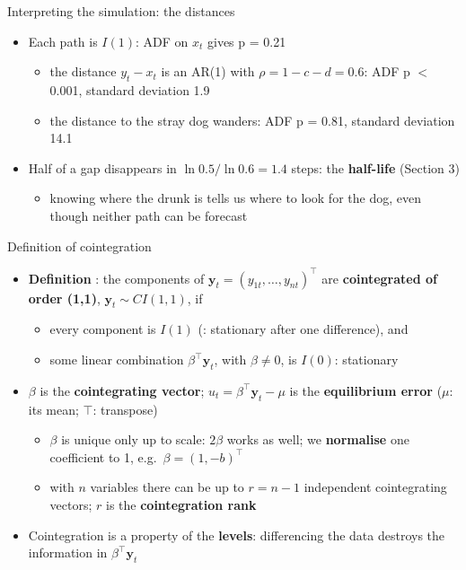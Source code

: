 \begin{frame}{Interpreting the simulation: the distances}
\itemsize{\small}
\begin{itemize}
    \item Each path is $I(1)$: ADF on $x_t$ gives p = 0.21
    \begin{itemize}
        \item the distance $y_t - x_t$ is an AR(1) with $\rho = 1 - c - d = 0.6$: ADF p $<$\,0.001, standard deviation 1.9
        \item the distance to the stray dog wanders: ADF p = 0.81, standard deviation 14.1
    \end{itemize}
    \item Half of a gap disappears in $\ln 0.5/\ln 0.6 = 1.4$ steps: the \textbf{half-life} (Section 3)
    \begin{itemize}
        \item knowing where the drunk is tells us where to look for the dog, even though neither path can be forecast
    \end{itemize}
\end{itemize}
\end{frame}

\begin{frame}{Definition of cointegration}
\itemsize{\small}
\begin{itemize}
    \item \textbf{Definition} : the components of $\mathbf y_t = (y_{1t}, \dots, y_{nt})^\top$ are \textbf{cointegrated of order (1,1)}, $\mathbf y_t \sim CI(1,1)$, if
    \begin{itemize}
        \item every component is $I(1)$ (: stationary after one difference), and
        \item some linear combination $\beta^\top \mathbf y_t$, with $\beta \neq 0$, is $I(0)$: stationary
    \end{itemize}
    \item $\beta$ is the \textbf{cointegrating vector}; $u_t = \beta^\top \mathbf y_t - \mu$ is the \textbf{equilibrium error} ($\mu$: its mean; $\top$: transpose)
    \begin{itemize}
        \item $\beta$ is unique only up to scale: $2\beta$ works as well; we \textbf{normalise} one coefficient to 1, e.g.\ $\beta = (1, -b)^\top$
        \item with $n$ variables there can be up to $r = n - 1$ independent cointegrating vectors; $r$ is the \textbf{cointegration rank}
    \end{itemize}
    \item Cointegration is a property of the \textbf{levels}: differencing the data destroys the information in $\beta^\top \mathbf y_t$
\end{itemize}
\end{frame}

